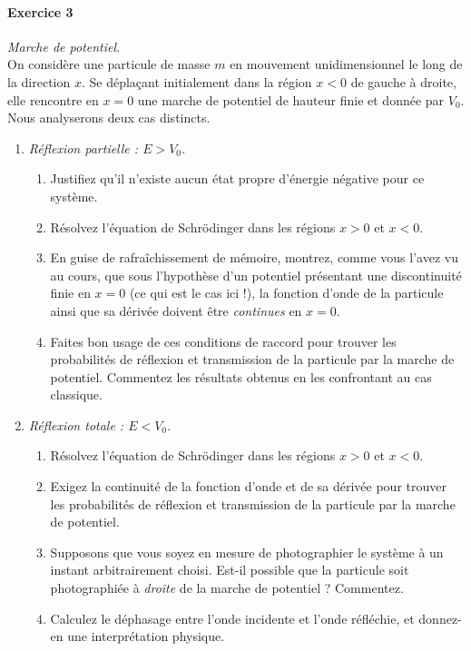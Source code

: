 \paragraph{Exercice 3} \textit{Marche de potentiel.} \\
On considère une particule de masse $m$ en mouvement unidimensionnel le long de la direction $x$. Se déplaçant initialement dans la région $x<0$ de gauche à droite, elle rencontre en $x=0$ une marche de potentiel de hauteur finie et donnée par $V_0$. Nous analyserons deux cas distincts.
\begin{enumerate}
\item \textit{Réflexion partielle : $E > V_0$.} 
	\begin{enumerate}
		\item Justifiez qu'il n'existe aucun état propre d'énergie négative pour ce système.
		\item Résolvez l'équation de Schrödinger dans les régions $x>0$ et $x<0$.
		\item En guise de rafraîchissement de mémoire, montrez, comme vous l'avez vu au cours, que sous l'hypothèse d'un potentiel présentant une discontinuité finie en $x=0$ (ce qui est le cas ici !), la fonction d'onde de la particule ainsi que sa dérivée doivent être \textit{continues} en $x=0$.
		\item Faites bon usage de ces conditions de raccord pour trouver les probabilités de réflexion et transmission de la particule par la marche de potentiel. Commentez les résultats obtenus en les confrontant au cas classique.
	\end{enumerate}
\item \textit{Réflexion totale : $E < V_0$.}
	\begin{enumerate}
		\item Résolvez l'équation de Schrödinger dans les régions $x>0$ et $x<0$.
		\item Exigez la continuité de la fonction d'onde et de sa dérivée pour trouver les probabilités de réflexion et transmission de la particule par la marche de potentiel. 
		\item Supposons que vous soyez en mesure de photographier le système à un instant arbitrairement choisi. Est-il possible que la particule soit photographiée à \textit{droite} de la marche de potentiel ? Commentez.
		\item Calculez le déphasage entre l'onde incidente et l'onde réfléchie, et donnez-en une interprétation physique.
	\end{enumerate}
\end{enumerate}

